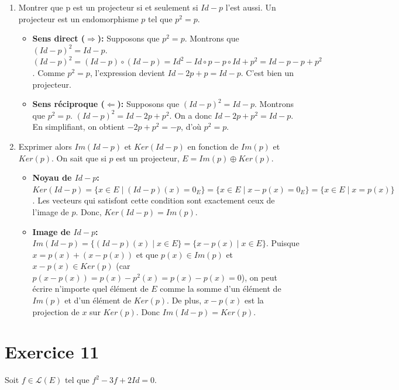 \documentclass[french]{yLectureNote}
\begin{document}
\begin{enumerate}
    \item Montrer que p est un projecteur si et seulement si $Id-p$ l'est aussi.
    Un projecteur est un endomorphisme $p$ tel que $p^2=p$.
    \begin{itemize}
        \item \textbf{Sens direct ($\Rightarrow$):} Supposons que $p^2=p$. Montrons que $(Id-p)^2=Id-p$.
        $(Id-p)^2 = (Id-p)\circ(Id-p) = Id^2 - Id\circ p - p\circ Id + p^2 = Id-p-p+p^2$.
        Comme $p^2=p$, l'expression devient $Id-2p+p = Id-p$. C'est bien un projecteur.
        \item \textbf{Sens réciproque ($\Leftarrow$):} Supposons que $(Id-p)^2=Id-p$. Montrons que $p^2=p$.
        $(Id-p)^2 = Id-2p+p^2$.
        On a donc $Id-2p+p^2 = Id-p$. En simplifiant, on obtient $-2p+p^2=-p$, d'où $p^2=p$.
    \end{itemize}

    \item Exprimer alors $Im(Id-p)$ et $Ker(Id-p)$ en fonction de $Im(p)$ et $Ker(p)$.
    On sait que si $p$ est un projecteur, $E=Im(p)\oplus Ker(p)$.
    \begin{itemize}
        \item \textbf{Noyau de $Id-p$:} $Ker(Id-p)=\{x \in E \mid (Id-p)(x)=0_E\} = \{x \in E \mid x-p(x)=0_E\} = \{x \in E \mid x=p(x)\}$. Les vecteurs qui satisfont cette condition sont exactement ceux de l'image de $p$. Donc, $Ker(Id-p)=Im(p)$.
        \item \textbf{Image de $Id-p$:} $Im(Id-p)=\{(Id-p)(x) \mid x \in E\}=\{x-p(x) \mid x \in E\}$.
        Puisque $x=p(x)+(x-p(x))$ et que $p(x) \in Im(p)$ et $x-p(x) \in Ker(p)$ (car $p(x-p(x))=p(x)-p^2(x)=p(x)-p(x)=0$), on peut écrire n'importe quel élément de $E$ comme la somme d'un élément de $Im(p)$ et d'un élément de $Ker(p)$. De plus, $x-p(x)$ est la projection de $x$ sur $Ker(p)$. Donc $Im(Id-p)=Ker(p)$.
    \end{itemize}
\end{enumerate}
\section{Exercice 11}

Soit $f \in \mathcal{L}(E)$ tel que $f^{2}-3f+2Id=0$.
\end{document}
